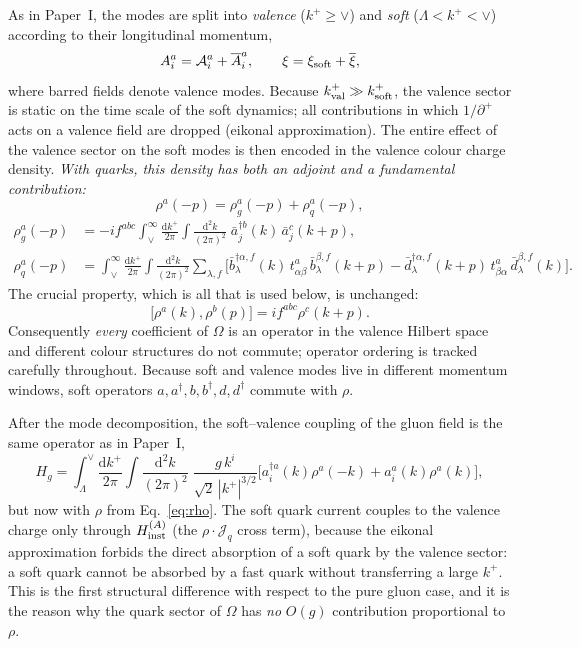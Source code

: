 \documentclass[11pt]{article}
\newcommand{\dd}{\mathrm{d}}
\newcommand{\dg}{\dagger}
\newcommand{\Lam}{\Lambda}
\newcommand{\OM}{\Omega}
\newcommand{\Hg}{H_{g}}
\begin{document}
As in Paper~I, the modes are split into {\em valence} ($k^+\ge\vee$) and {\em soft}
($\Lam<k^+<\vee$) according to their longitudinal momentum,
\begin{equation}
A^a_i=\mathcal A^a_i+\overline{A}^a_i,\qquad
\xi=\xi_{\rm soft}+\overline{\xi},
\end{equation}
where barred fields denote valence modes. Because $k^+_{\rm val}\gg k^+_{\rm soft}$, the valence
sector is static on the time scale of the soft dynamics; all contributions in which
$1/\partial^+$ acts on a valence field are dropped (eikonal approximation). The entire effect of
the valence sector on the soft modes is then encoded in the valence colour charge density.
{\em With quarks, this density has both an adjoint and a fundamental contribution:}
\begin{equation}
\rho^a(-p)=\rho^a_g(-p)+\rho^a_q(-p),
\label{eq:rho}
\end{equation}
\begin{align}
\rho^a_g(-p)&=-if^{abc}\int_\vee^\infty\!\frac{\dd k^+}{2\pi}\!\int\!\frac{\dd^2k}{(2\pi)^2}\;
\bar a^{\dg b}_j(k)\,\bar a^c_j(k+p),\\
\rho^a_q(-p)&=\int_\vee^\infty\!\frac{\dd k^+}{2\pi}\!\int\!\frac{\dd^2k}{(2\pi)^2}\sum_{\lambda,f}
\Big[\bar b^{\dg\alpha,f}_\lambda(k)\,t^a_{\alpha\beta}\,\bar b^{\beta,f}_\lambda(k+p)
-\bar d^{\dg\alpha,f}_\lambda(k+p)\,t^a_{\beta\alpha}\,\bar d^{\beta,f}_\lambda(k)\Big].
\end{align}
The crucial property, which is all that is used below, is unchanged:
\begin{equation}
\big[\rho^a(k),\rho^b(p)\big]=if^{abc}\rho^c(k+p).
\label{eq:rhoalgebra}
\end{equation}
Consequently {\em every} coefficient of $\OM$ is an operator in the valence Hilbert space and
different colour structures do not commute; operator ordering is tracked carefully throughout.
Because soft and valence modes live in different momentum windows, soft operators
$a,a^\dg,b,b^\dg,d,d^\dg$ commute with $\rho$.

After the mode decomposition, the soft--valence coupling of the gluon field is the same operator
as in Paper~I,
\begin{equation}
\Hg=\int_\Lam^\vee\!\frac{\dd k^+}{2\pi}\!\int\!\frac{\dd^2k}{(2\pi)^2}\;
\frac{g\,k^i}{\sqrt2\,|k^+|^{3/2}}\Big[a^{\dg a}_i(k)\rho^a(-k)+a^a_i(k)\rho^a(k)\Big],
\label{eq:Hgop}
\end{equation}
but now with $\rho$ from Eq.~\eqref{eq:rho}. The soft quark current couples to the valence charge
only through $H^{(A)}_{\rm inst}$ (the $\rho\!\cdot\!\mathcal J_q$ cross term), because the
eikonal approximation forbids the direct absorption of a soft quark by the valence sector: a soft
quark cannot be absorbed by a fast quark without transferring a large $k^+$. This is the first
structural difference with respect to the pure gluon case, and it is the reason why the quark
sector of $\OM$ has {\em no} $O(g)$ contribution proportional to $\rho$.
\end{document}
